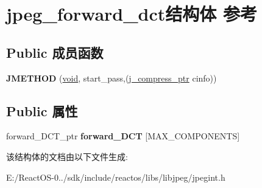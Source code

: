 \hypertarget{structjpeg__forward__dct}{}\section{jpeg\+\_\+forward\+\_\+dct结构体 参考}
\label{structjpeg__forward__dct}
\subsection*{Public 成员函数}
\begin{DoxyCompactItemize}
\item 
\mbox{\label{structjpeg__forward__dct_a51b3b61e60becc93a36b41e26fd2c616}} 
{\bfseries J\+M\+E\+T\+H\+OD} (\hyperlink{interfacevoid}{void}, start\+\_\+pass,(\hyperlink{structjpeg__compress__struct}{j\+\_\+compress\+\_\+ptr} cinfo))
\end{DoxyCompactItemize}
\subsection*{Public 属性}
\begin{DoxyCompactItemize}
\item 
\mbox{\label{structjpeg__forward__dct_a227dc1b935c81ac94fc81521be709faf}} 
forward\+\_\+\+D\+C\+T\+\_\+ptr {\bfseries forward\+\_\+\+D\+CT} \mbox{[}M\+A\+X\+\_\+\+C\+O\+M\+P\+O\+N\+E\+N\+TS\mbox{]}
\end{DoxyCompactItemize}


该结构体的文档由以下文件生成\+:\begin{DoxyCompactItemize}
\item 
E\+:/\+React\+O\+S-\/0../sdk/include/reactos/libs/libjpeg/jpegint.\+h\end{DoxyCompactItemize}
